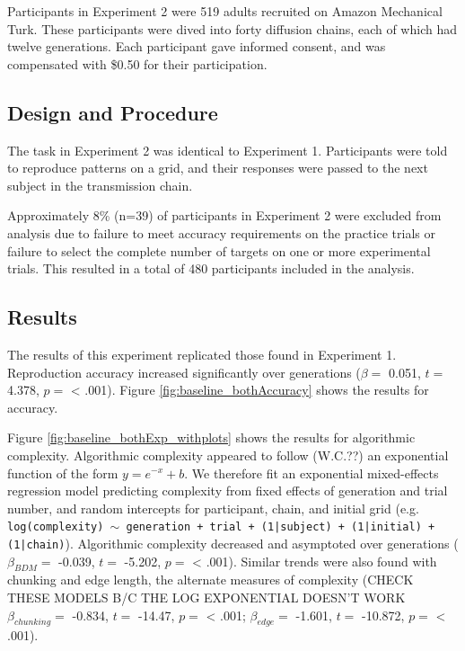 \documentclass[10pt, letterpaper]{article}
\begin{document}
Participants in Experiment 2 were 519 adults recruited on Amazon
Mechanical Turk. These participants were dived into forty diffusion
chains, each of which had twelve generations. Each participant gave
informed consent, and was compensated with \$0.50 for their
participation.

\hypertarget{design-and-procedure-1}{%
\subsection{Design and Procedure}\label{design-and-procedure-1}}

The task in Experiment 2 was identical to Experiment 1. Participants
were told to reproduce patterns on a grid, and their responses were
passed to the next subject in the transmission chain.

Approximately 8\% (n=39) of participants in Experiment 2 were excluded
from analysis due to failure to meet accuracy requirements on the
practice trials or failure to select the complete number of targets on
one or more experimental trials. This resulted in a total of 480
participants included in the analysis.

\hypertarget{results-1}{%
\subsection{Results}\label{results-1}}

The results of this experiment replicated those found in Experiment 1.
Reproduction accuracy increased significantly over generations
(\(\beta =\) 0.051, \(t =\) 4.378, \(p =\) \textless{} .001). Figure
\ref{fig:baseline_bothAccuracy} shows the results for accuracy.

Figure \ref{fig:baseline_bothExp_withplots} shows the results for
algorithmic complexity. Algorithmic complexity appeared to follow
(W.C.??) an exponential function of the form \(y = e^{-x} + b\). We
therefore fit an exponential mixed-effects regression model predicting
complexity from fixed effects of generation and trial number, and random
intercepts for participant, chain, and initial grid (e.g.
\texttt{log(complexity) $\sim$ generation + trial + (1|subject) + (1|initial) + (1|chain)}).
Algorithmic complexity decreased and asymptoted over generations
(\(\beta_{BDM} =\) -0.039, \(t =\) -5.202, \(p =\) \textless{} .001).
Similar trends were also found with chunking and edge length, the
alternate measures of complexity (CHECK THESE MODELS B/C THE LOG
EXPONENTIAL DOESN'T WORK \(\beta_{chunking} =\) -0.834, \(t =\) -14.47,
\(p =\) \textless{} .001; \(\beta_{edge} =\) -1.601, \(t =\) -10.872,
\(p =\) \textless{} .001).
\end{document}
